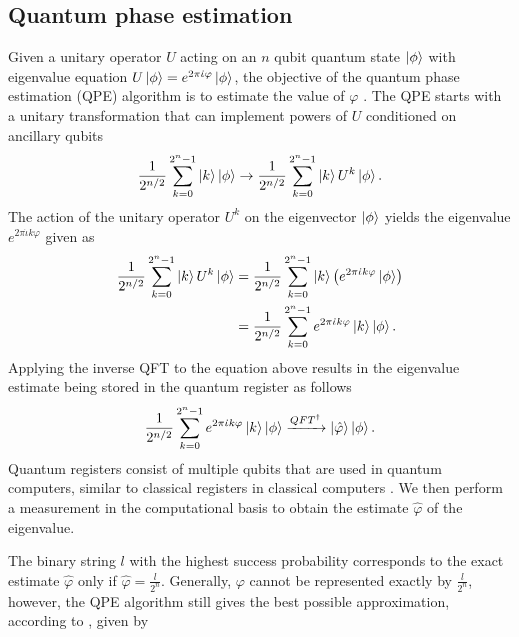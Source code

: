 \documentclass[10pt]{article}
\begin{document}
	\subsection{\label{sec: QPE}Quantum phase estimation}
	Given a unitary operator $U$ acting on an $n$ qubit quantum state $\ket{\phi}$ with eigenvalue equation $U\ket{\phi}=e^{2\pi \dot{\iota}\varphi}\ket{\phi}$, the objective of the quantum phase estimation (QPE) algorithm is to estimate the value of $\varphi$ \citep{kitaev1995QPE}. The QPE starts with a unitary transformation that can implement powers of $U$ conditioned on ancillary qubits
	\begin{equation} 
		\frac{1}{2^{n/2}}  \sum_{k=0}^{2^{n}-1}\ket{k}\ket{\phi}\rightarrow  \frac{1}{2^{n/2}} \sum_{k=0}^{2^{n}-1}\ket{k}U^{k}\ket{\phi}.
	\end{equation}
	The action of the unitary operator $U^{k}$ on the eigenvector $\ket{\phi}$ yields the eigenvalue $e^{2\pi \dot{\iota} k \varphi}$ given as
	\begin{equation}
		\begin{aligned} \label{eq: QPE}
			\frac{1}{2^{n/2}} \sum_{k=0}^{2^{n}-1}\ket{k}U^{k}\ket{\phi} &=\frac{1}{2^{n/2}} \sum_{k=0}^{2^{n}-1}\ket{k}\left(e^{2\pi \dot{\iota}k\varphi}\ket{\phi}\right)\nonumber\\&=\frac{1}{2^{n/2}} \sum_{k=0}^{2^{n}-1} e^{2\pi \dot{\iota}k\varphi}\ket{k}\ket{\phi}.
		\end{aligned}
	\end{equation}
	Applying the inverse QFT to the equation above results in the eigenvalue estimate being stored in the quantum register as follows
	\begin{equation}
		\frac{1}{2^{n/2}} \sum_{k=0}^{2^{n}-1} e^{2\pi \dot{\iota}k\varphi}\ket{k}\ket{\phi}\xrightarrow[]{QFT^{\dagger}} \ket{\hat{\varphi}} \ket{\phi}.
	\end{equation}
	Quantum registers consist of multiple qubits that are used in quantum computers, similar to classical registers in classical computers \citep{Nielsen2011QuantumComputing}. We then perform a measurement in the computational basis to obtain the estimate $\hat{\varphi}$ of the eigenvalue.
	
	The binary string $l$ with the highest success probability corresponds to the exact estimate $\hat{\varphi}$ only if $\hat{\varphi} = \frac{l}{2^{n}}$.
	Generally, $\varphi$ cannot be represented exactly by $\frac{l}{2^{n}}$, however, the QPE algorithm still gives the best possible approximation, according to  \citet{kitaev1995QPE}, given by
	
\end{document}
